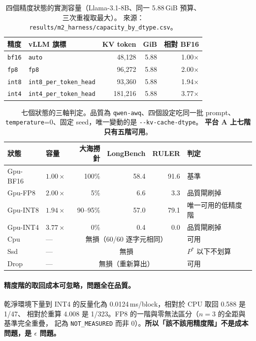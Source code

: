 \documentclass[11pt]{article}
\newcommand{\act}[1]{\textsf{\footnotesize #1}}
\newcommand{\key}[1]{\textcolor{hlcol}{\textbf{#1}}}
\begin{document}
\begin{table}[htbp]\centering\small
\caption{四個精度狀態的實測容量（Llama-3.1-8B、同一 5.88\,GiB 預算、三次重複取最大）。
來源：\texttt{results/m2\_harness/capacity\_by\_dtype.csv}。}
\begin{tabular}{llrrr}
\toprule
精度 & vLLM 旗標 & KV token & GiB & 相對 BF16 \\
\midrule
\texttt{bf16} & \texttt{auto} & 48,128 & 5.88 & 1.00$\times$ \\
\texttt{fp8} & \texttt{fp8} & 96,272 & 5.88 & 2.00$\times$ \\
\texttt{int8} & \texttt{int8\_per\_token\_head} & 93,360 & 5.88 & 1.94$\times$ \\
\texttt{int4} & \texttt{int4\_per\_token\_head} & 181,216 & 5.88 & 3.77$\times$ \\
\bottomrule
\end{tabular}
\end{table}

\begin{table}[htbp]\centering\small
\caption{七個狀態的三軸判定。品質為 \texttt{qwen-awq}、四個設定吃同一批 prompt、
\texttt{temperature}=0、固定 seed，唯一變動的是 \texttt{-{}-kv-cache-dtype}。
\key{平台 A 上七階只有五階可用}。}
\begin{tabular}{llrrrl}
\toprule
狀態 & 容量 & 大海撈針 & LongBench & RULER & 判定 \\
\midrule
\act{Gpu-BF16} & $1.00\times$ & 100\% & 58.4 & 91.6 & 基準 \\
\act{Gpu-FP8} & $2.00\times$ & 5\% & 6.6 & 3.3 & \textcolor{gpucol}{品質閘刷掉} \\
\act{Gpu-INT8} & $1.94\times$ & 90–95\% & 57.0 & 79.1 & \textcolor{hlcol}{唯一可用的低精度階} \\
\act{Gpu-INT4} & $3.77\times$ & 0\% & 0.4 & 0.0 & \textcolor{gpucol}{品質閘刷掉} \\
\act{Cpu} & — & \multicolumn{3}{c}{無損（60/60 逐字元相同）} & 可用 \\
\act{Ssd} & — & \multicolumn{3}{c}{無損} & \textcolor{hlcol}{$P^{*}$ 以下不划算} \\
\act{Drop} & — & \multicolumn{3}{c}{無損（重新算出）} & 可用 \\
\bottomrule
\end{tabular}
\end{table}

\paragraph{精度階的取回成本可忽略，問題全在品質。}
乾淨環境下量到 INT4 的反量化為 0.0124\,ms/block，相對於 CPU 取回 0.588 是 1/47、
相對於重算 4.008 是 1/323。FP8 的一階與零無法區分（$n=3$ 的全距與基準完全重疊，
記為 \texttt{NOT\_MEASURED} 而非 0）。\key{所以「該不該用精度階」不是成本問題，是 $\epsilon$ 問題。}
\end{document}
